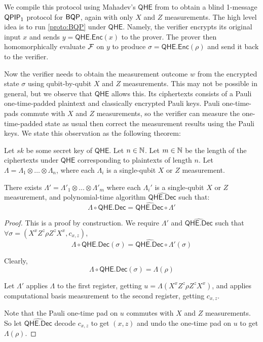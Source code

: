 We compile this protocol using Mahadev's $\mathsf{QHE}$ from \cite{mahadev_qfhe} to obtain a blind 1-message $\operatorname{\mathsf{QPIP}}_1$ protocol for $\operatorname{\mathsf{BQP}}$, again with only $X$ and $Z$ measurements.
The high level idea is to run \cref{proto:BQP} under $\mathsf{QHE}$.
Namely, the verifier encrypts its original input $x$ and sends $y=\mathsf{QHE.Enc}(x)$ to the prover.
The prover then homomorphically evaluate $\mathcal{F}$ on $y$ to produce $\sigma=\mathsf{QHE.Enc}(\rho)$  and send it back to the verifier.

Now the verifier needs to obtain the measurement outcome $w$ from the encrypted state $\sigma$ using qubit-by-qubit $X$ and $Z$ measurements.
This may not be possible in general, but we observe that $\mathsf{QHE}$ allows this. 
Its ciphertexts consists of a Pauli one-time-padded plaintext and classically encrypted Pauli keys.
Pauli one-time-pads commute with $X$ and $Z$ measurements, so the verifier can measure the one-time-padded state as usual then correct the measurement results using the Pauli keys.
We state this observation as the following theorem:

\begin{thm}
	\label{decodeMeasureOrder}
	Let $sk$ be some secret key of $\mathsf{QHE}$.
	Let $n\in\mathbb{N}$.
	Let $m\in\mathbb{N}$ be the length of the ciphertexts under $\mathsf{QHE}$ corresponding to plaintexts of length $n$.
	Let $\Lambda=\Lambda_1\otimes\ldots\otimes\Lambda_n$, where each $\Lambda_i$ is a single-qubit $X$ or $Z$ measurement.

	There exists $\Lambda'=\Lambda'_1\otimes\ldots\otimes\Lambda'_m$ where each $\Lambda_i'$ is a single-qubit $X$ or $Z$ measurement, and polynomial-time algorithm $\widehat{\mathsf{QHE.Dec}}$ such that:
	$$\Lambda\circ\mathsf{QHE.Dec}=\widehat{\mathsf{QHE.Dec}}\circ\Lambda'$$
\end{thm}
\begin{proof}
	This is a proof by construction.
	We require $\Lambda'$ and $\widehat{\mathsf{QHE.Dec}}$ such that $\forall\sigma=(X^xZ^z\rho Z^zX^x, c_{x,z})$,
	$$\Lambda\circ\mathsf{QHE.Dec}(\sigma)=\widehat{\mathsf{QHE.Dec}}\circ\Lambda'(\sigma)$$

	Clearly,
	$$\Lambda\circ\mathsf{QHE.Dec}(\sigma)=\Lambda(\rho)$$
	
	Let $\Lambda'$ applies $\Lambda$ to the first register, getting $u=\Lambda(X^xZ^z\rho Z^zX^x)$, and applies computational basis measurement to the second register, getting $c_{x, z}$.

	Note that the Pauli one-time pad on $u$ commutes with $X$ and $Z$ measurements.
	So let $\widehat{\mathsf{QHE.Dec}}$ decode $c_{x, z}$ to get $(x, z)$ and undo the one-time pad on $u$ to get $\Lambda(\rho)$.
\end{proof}


